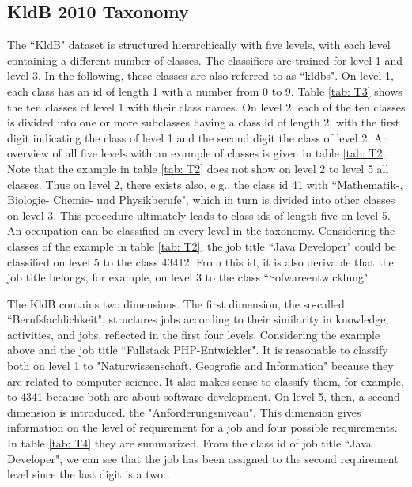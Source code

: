 \documentclass[12pt, a4paper, titlepage]{article}
\begin{document}
\subsection{KldB 2010 Taxonomy}
The ``\ac{KldB}" dataset is structured hierarchically with five levels, with each level containing a different number of classes. The classifiers are trained for level 1 and level 3. In the following, these classes are also referred to as ``kldbs". On level 1, each class has an id of length 1 with a number from 0 to 9. Table \ref{tab: T3} shows the ten classes of level 1 with their class names. On level 2, each of the ten classes is divided into one or more subclasses having a class id of length 2, with the first digit indicating the class of level 1 and the second digit the class of level 2. An overview of all five levels with an example of classes is given in table \ref{tab: T2}. Note that the example in table \ref{tab: T2} does not show on level 2 to level 5 all classes. Thus on level 2, there exists also, e.g., the class id 41 with ``Mathematik-, Biologie- Chemie- und Physikberufe", which in turn is divided into other classes on level 3. This procedure ultimately leads to class ids of length five on level 5. An occupation can be classified on every level in the taxonomy. Considering the classes of the example in table \ref{tab: T2}, the job title ``Java Developer" could  be classified on level 5 to the class 43412. From this id, it is also derivable that the job title belongs, for example, on level 3 to the class ``Sofwareentwicklung" \citep{Bundesagentur2011a, Bundesagentur2011b, Paulus2013}

The \ac{KldB} contains two dimensions. The first dimension, the so-called ``Berufsfachlichkeit", structures jobs according to their similarity in knowledge, activities, and jobs, reflected in the first four levels. Considering the example above and the job title ``Fullstack PHP-Entwickler". It is reasonable to classify both on level 1 to "Naturwissenschaft, Geografie and Information" because they are related to computer science. It also makes sense to classify them, for example, to 4341 because both are about software development. On level 5, then, a second dimension is introduced. the "Anforderungsniveau". This dimension gives information on the level of requirement for a job and four possible requirements. In table \ref{tab: T4} they are summarized. From the class id of job title ``Java Developer", we can see that the job has been assigned to the second requirement level since the last digit is a two \citep{Bundesagentur2011a, Bundesagentur2011b, Paulus2013}. 
\end{document}
